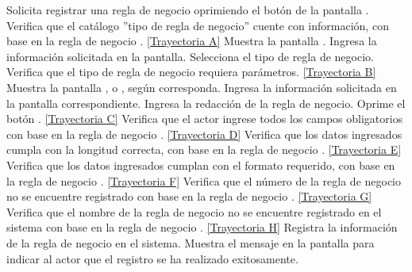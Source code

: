 	\begin{UCtrayectoria}
		\UCpaso[\UCactor] Solicita registrar una regla de negocio oprimiendo el botón  de la pantalla .
		\UCpaso[\UCsist] Verifica que el catálogo ''tipo de regla de negocio'' cuente con información, con base en la regla de negocio . \hyperlink{CU8-1:TAA}{[Trayectoria A]}
		\UCpaso[\UCsist] Muestra la pantalla .
		\UCpaso[\UCactor] Ingresa la información solicitada en la pantalla. \label{CU8.1-P3}
		\UCpaso[\UCactor] Selecciona el tipo de regla de negocio.
		\UCpaso[\UCsist] Verifica que el tipo de regla de negocio requiera parámetros. \hyperlink{CU8-1:TAB}{[Trayectoria B]}
		\UCpaso[\UCsist] Muestra la pantalla ,  o , según corresponda.
		\UCpaso[\UCactor] Ingresa la información solicitada en la pantalla correspondiente.
		\UCpaso[\UCactor] Ingresa la redacción de la regla de negocio. \label{CU8.1-P9}
		\UCpaso[\UCactor] Oprime el botón . \hyperlink{CU8-1:TAC}{[Trayectoria C]}
		\UCpaso[\UCsist] Verifica que el actor ingrese todos los campos obligatorios con base en la regla de negocio . \hyperlink{CU8-1:TAD}{[Trayectoria D]}
		\UCpaso[\UCsist] Verifica que los datos ingresados cumpla con la longitud correcta, con base en la regla de negocio . \hyperlink{CU8-1:TAE}{[Trayectoria E]}
		\UCpaso[\UCsist] Verifica que los datos ingresados cumplan con el formato requerido, con base en la regla de negocio . \hyperlink{CU8-1:TAF}{[Trayectoria F]}
		\UCpaso[\UCsist] Verifica que el número de la regla de negocio no se encuentre registrado con base en la regla de negocio . \hyperlink{CU8-1:TAG}{[Trayectoria G]}
		\UCpaso[\UCsist] Verifica que el nombre de la regla de negocio no se encuentre registrado en el sistema con base en la regla de negocio . \hyperlink{CU8-1:TAH}{[Trayectoria H]}
		\UCpaso[\UCsist] Registra la información de la regla de negocio en el sistema.
		\UCpaso[\UCsist] Muestra el mensaje  en la pantalla  para indicar al actor que el registro se ha realizado exitosamente.
	\end{UCtrayectoria}		
